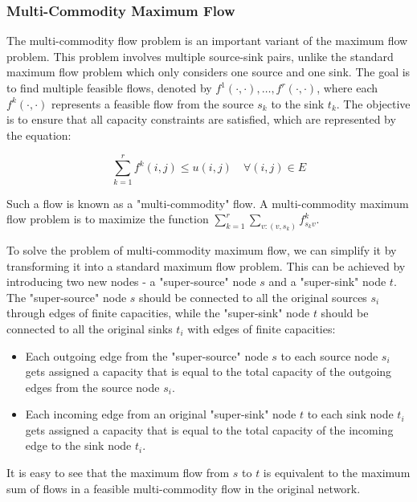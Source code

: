 \documentclass{article} %
\theoremstyle{bfnote}
\begin{document}
\subsubsection{Multi-Commodity Maximum Flow}
The multi-commodity flow problem is an important variant of the maximum flow problem. This problem involves multiple source-sink pairs, unlike the standard maximum flow problem which only considers one source and one sink. The goal is to find multiple feasible flows, denoted by $f^1(\cdot, \cdot), \ldots, f^r(\cdot, \cdot)$, where each $f^k(\cdot, \cdot)$ represents a feasible flow from the source $s_k$ to the sink $t_k$. The objective is to ensure that all capacity constraints are satisfied, which are represented by the equation:

\begin{equation}
	\sum_{k=1}^r f^k(i, j) \leq u(i, j) \quad \forall(i, j) \in E
	\label{eq:2}
\end{equation}

Such a flow is known as a "multi-commodity" flow. A multi-commodity maximum flow problem is to maximize the function $\sum_{k=1}^r \sum_{v:(v, s_k)} f^k_{s_k v}$.
	

To solve the problem of multi-commodity maximum flow, we can simplify it by transforming it into a standard maximum flow problem. This can be achieved by introducing two new nodes - a "super-source" node $s$ and a "super-sink" node $t$. The "super-source" node $s$ should be connected to all the original sources $s_i$ through edges of finite capacities, while the "super-sink" node $t$ should be connected to all the original sinks $t_i$ with edges of finite capacities:

\begin{itemize}
	\item Each outgoing edge from the "super-source" node $s$ to each source
	node $s_i$ gets assigned a capacity that is equal to the total capacity of the
	outgoing edges from the source node $s_i$.
	
	\item Each incoming edge from an original "super-sink" node $t$ to each sink
	node $t_i$ gets assigned a capacity that is equal to the total capacity of the
	incoming edge to the sink node $t_i$.
\end{itemize}

It is easy to see that the maximum flow from $s$ to $t$ is equivalent to the maximum sum of flows in a feasible multi-commodity flow in the original network.
\end{document}
